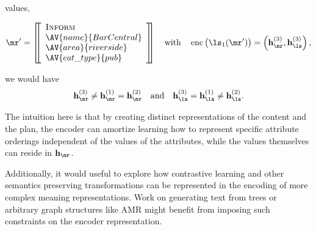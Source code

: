values,\begin{singlespace}\[
    \mr^\prime = \left[\!\!\left[  \begin{array}{l} \textsc{Inform} \\ \AV{name}{Bar Central} \\ \AV{area}{riverside} \\ \AV{eat\_type}{pub} \end{array} \right]\!\!\right] \quad \textrm{with} \quad  \operatorname{enc}\left(\ls_1(\mr^\prime)\right) = \left(\mathbf{h}^{(3)}_\mr, \mathbf{h}^{(3)}_{\ls}\right),
\]\end{singlespace} 
we would have 
\[ \mathbf{h}^{(3)}_\mr \ne \mathbf{h}^{(1)}_\mr = \mathbf{h}^{(2)}_\mr\quad \textrm{and} \quad  \mathbf{h}^{(3)}_{\ls} = \mathbf{h}^{(1)}_{\ls} \ne  \mathbf{h}^{(2)}_{\ls}. \]

The intuition here is that by creating distinct representations of the 
content and the plan, the encoder can amortize learning how to represent 
specific attribute orderings independent of the values of the attributes, while
the values themselves can reside in $\mathbf{h}_\mr$.

Additionally, it would useful to explore how contrastive learning
and other semantics preserving transformations can be represented in the 
encoding of more complex meaning representations. Work on generating text 
from  trees \citep{balakrishnan2019} or arbitrary graph structures like  AMR
\citep{wang2020} might benefit from imposing such constraints 
on the encoder representation.
